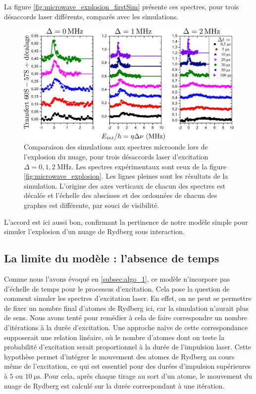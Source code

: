 La figure \eqref{fig:microwave_explosion_firstSim} présente ces spectres, pour trois désaccords laser différents, comparés avec les simulations.
%
\begin{figure}[!h]
\centering
\includegraphics[width=\linewidth]{figures/low_l/expansion_012MHz_fisrtSim}
\caption[Comparaison des simulations aux spectres microonde lors de l'explosion du nuage]{
Comparaison des simulations aux spectres microonde lors de l'explosion du nuage, pour trois désaccords laser d'excitation $\Delta = \num{0}, \num{1}, \SI{2}{\MHz}$.
Les spectres expérimentaux sont ceux de la figure \ref{fig:microwave_explosion}.
Les lignes pleines sont les résultats de la simulation.
L'origine des axes verticaux de chacun des spectres est décalée et l'échelle des abscisses et des ordonnées de chacun des graphes est différente, par souci de visibilité.
}
\label{fig:microwave_explosion_firstSim}
\end{figure}
%
L'accord est ici aussi bon, confirmant la pertinence de notre modèle simple pour simuler l'explosion d'un nuage de Rydberg sous interaction.

\subsection{La limite du modèle : l'absence de temps}
\noindent Comme nous l'avons évoqué en \ref{subsec:algo_1}, ce modèle n'incorpore pas d'échelle de temps pour le processus d'excitation.
Cela pose la question de comment simuler les spectres d'excitation laser.
En effet, on ne peut se permettre de fixer un nombre final d'atomes de Rydberg ici, car la simulation n'aurait plus de sens.
Nous avons tenté pour remédier à cela de faire correspondre un nombre d'itérations à la durée d'excitation.
Une approche naïve de cette correspondance supposerait une relation linéaire, où le nombre d'atomes dont on teste la probabilité d'excitation serait proportionnel à la durée de l'impulsion laser.
Cette hypothèse permet d'intégrer le mouvement des atomes de Rydberg au cours même de l'excitation, ce qui est essentiel pour des durées d'impulsion supérieures à $\num{5}$ ou $\SI{10}{\us}$.
Pour cela, après chaque tirage au sort d'un atome, le mouvement du nuage de Rydberg est calculé sur la durée correspondant à une itération.

